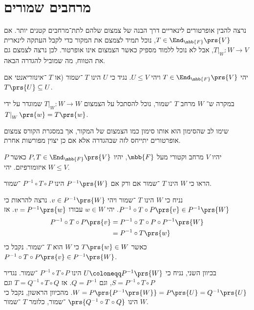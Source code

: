 \documentclass[a4paper,10pt,twoside,openany]{book}
\begin{document}
\section{מרחבים שמורים}

נרצה להבין אופרטורים לינאריים דרך הבנה של צמצום שלהם לתת־מרחבים קטנים יותר.
אם
$T \in \End_{\mbb{F}}\prs{V}$,
נוכל תמיד לצמצם את המקור כדי לקבל העתקה לינארית
$\left. T \right|_{W} \colon W \to V$,
אבל לא נוכל ללמוד מספיק כאשר הצמצום אינו אופרטור. לכן נרצה לצמצם גם את הטווח, מה שמוביל להגדרה הבאה.

\begin{definition}
יהי
$T \in \End_{\mbb{F}}\prs{V}$
ויהי
$U \leq V$.
נגיד כי
$U$
הינו
\emph{$T$%
־שמור} (או
\emph{$T$%
־אינווריאנטי}
אם
$T\prs{U} \subseteq U$.
\end{definition}

\begin{definition}
במקרה ש־%
$W$
מרחב
$T$%
־שמור, נוכל להסתכל על הצמצום
$\left. T \right|_W \colon W \to W$
שמוגדר על ידי
$\left. T \right|_W \prs{w} = T\prs{w}$.
\end{definition}

\begin{remark}
שימו לב שהסימון הוא אותו סימון כמו הצמצום של המקור, אך במסגרת הקורס צמצום אופרטורים יתייחס לזה שבהגדרה אלא אם כן יצוין מפורשות אחרת.
\end{remark}

\begin{exercisechap}
יהיו
$V$
מרחב וקטורי
מעל
$\mbb{F}$,
יהיו
$P,T \in \End_{\mbb{F}}\prs{V}$
כאשר
$P$
איזומורפיזם.
יהי
$W \leq V$.

הראו כי
$W$
הינו
$T$%
־שמור אם ורק אם
$P^{-1}\prs{W}$
הינו
$P^{-1} \circ T \circ P$%
־שמור.
\end{exercisechap}

\begin{solution}
נניח כי
$W$
הינו
$T$%
־שמור ויהי
$v \in P^{-1}\prs{W}$.
נרצה להראות כי
$P^{-1} \circ T \circ P \prs{v} \in P^{-1}\prs{W}$.
יהי
$w \in W$
עבורו
$v = P^{-1}\prs{w}$.
אז
\begin{align*}
P^{-1} \circ T \circ P \prs{v} &= P^{-1} \circ T \circ P \circ P^{-1}\prs{W}
\\&= P^{-1} \circ T \prs{w}
\end{align*}
כאשר
$T\prs{w} \in W$
כי
$W$
הוא
$T$%
־שמור. נקבל כי
$P^{-1} \circ T \circ P \prs{v} \in P^{-1}\prs{W}$.

בכיוון השני, נניח כי
$U \coloneqq P^{-1}\prs{W}$
הינו
$P^{-1} \circ T \circ P$%
־שמור.
נגדיר
$S = P^{-1} \circ T \circ P$,
וגם
$Q = P^{-1}$.
אז
$T = Q^{-1} \circ T \circ Q$
וגם
$W = P\prs{P^{-1}\prs{W}} = P\prs{U} = Q^{-1}\prs{U}$.
מהכיוון הראשון, נקבל כי
$W$
הינו
$\prs{Q^{-1} \circ T \circ Q}$%
־שמור, כלומר
$T$%
־שמור.
\end{solution}
\end{document}
